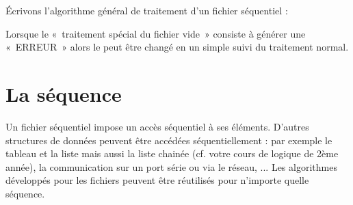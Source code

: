 
Écrivons l'algorithme général de traitement
d'un fichier séquentiel :


Lorsque le «~traitement spécial du fichier vide~» consiste à générer une
«~ERREUR~» alors le  peut être changé
en un simple  suivi du traitement normal.

\section{La séquence}

Un fichier séquentiel impose un accès séquentiel à ses éléments.
D'autres structures de données peuvent être accédées
séquentiellement : par exemple le tableau et la liste mais aussi la
liste chainée (cf. votre cours de logique de 2ème année), la
communication sur un port série ou via le réseau, ... Les algorithmes
développés pour les fichiers peuvent être réutilisés pour
n'importe quelle séquence.

